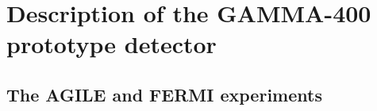 
\chapter{Description of the GAMMA-400 prototype detector}
\label{cap:experiment}
%
%



\section{{\color{red}The AGILE and FERMI experiments}}
\label{sec:agile_fermi}

